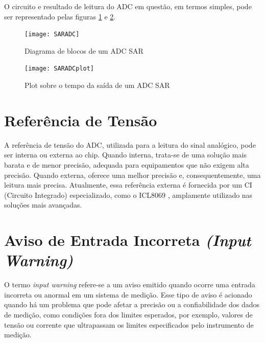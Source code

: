 O circuito e resultado de leitura do \gls{ADC} em questão, em termos simples, pode ser representado pelas figuras \ref{fig:SARADC} e \ref{fig:SARADCplot}.

\begin{figure}[htb!]%
    \caption{Diagrama de blocos de um ADC SAR}%
    \label{fig:SARADC}%
    \texttt{[image: SARADC]}%
\end{figure}

\begin{figure}[htb!]%
    \caption{Plot sobre o tempo da saída de um ADC SAR}%
    \label{fig:SARADCplot}%
    \texttt{[image: SARADCplot]}%
\end{figure}

\section{Referência de Tensão}\label{sec:VoltageReference}

A referência de tensão do ADC, utilizada para a leitura do sinal analógico, pode ser interna ou externa ao chip. Quando interna, trata-se de uma solução mais barata e de menor precisão, adequada para equipamentos que não exigem alta precisão. Quando externa, oferece uma melhor precisão e, consequentemente, uma leitura mais precisa. Atualmente, essa referência externa é fornecida por um \gls{CI} (Circuito Integrado) especializado, como o ICL8069 \cite{icl8069}, amplamente utilizado nas soluções mais avançadas.

\section{Aviso de Entrada Incorreta \textit{(Input Warning)}}\label{sec:inpWarning}

O termo \textit{input warning} refere-se a um aviso emitido quando ocorre uma entrada incorreta ou anormal em um sistema de medição. Esse tipo de aviso é acionado quando há um problema que pode afetar a precisão ou a confiabilidade dos dados de medição, como condições fora dos limites esperados, por exemplo, valores de tensão ou corrente que ultrapassam os limites especificados pelo instrumento de medição.

